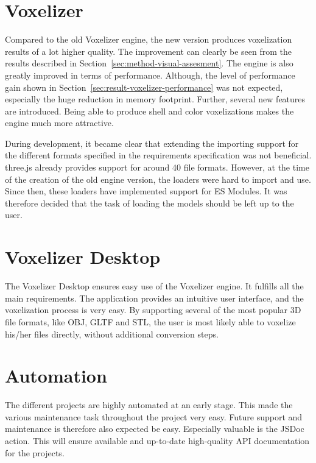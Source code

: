 \section{Voxelizer}
\label{sec:discussion-voxelizer}
Compared to the old Voxelizer engine, the new version produces voxelization results of a lot higher quality. The improvement can clearly be seen from the results described in Section~\ref{sec:method-visual-assesment}. The engine is also greatly improved in terms of performance. Although, the level of performance gain shown in Section~\ref{sec:result-voxelizer-performance} was not expected, especially the huge reduction in memory footprint. Further, several new features are introduced. Being able to produce shell and color voxelizations makes the engine much more attractive.

During development, it became clear that extending the importing support for the different formats specified in the requirements specification was not beneficial. three.js already provides support for around 40 file formats. However, at the time of the creation of the old engine version, the loaders were hard to import and use. Since then, these loaders have implemented support for ES Modules. It was therefore decided that the task of loading the models should be left up to the user.

\section{Voxelizer Desktop}
\label{sec:discussion-voxelizer-desktop}
The Voxelizer Desktop ensures easy use of the Voxelizer engine. It fulfills all the main requirements. The application provides an intuitive user interface, and the voxelization process is very easy. By supporting several of the most popular 3D file formats, like OBJ, GLTF and STL, the user is most likely able to voxelize his/her files directly, without additional conversion steps.

\section{Automation}
\label{sec:discussion-automation}
The different projects are highly automated at an early stage. This made the various maintenance task throughout the project very easy. Future support and maintenance is therefore also expected be easy. Especially valuable is the JSDoc action. This will ensure available and up-to-date high-quality API documentation for the projects.

